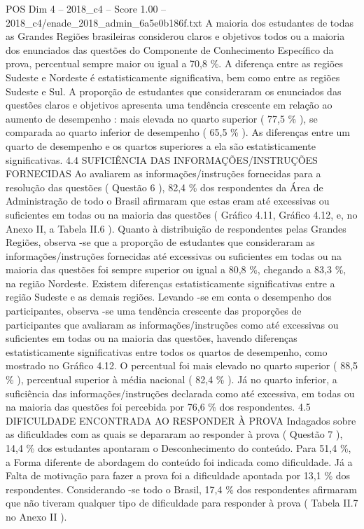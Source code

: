 \begin{textsample}{POS Dim 4 – 2018\_c4 – Score 1.00 – 2018\_c4/enade\_2018\_admin\_6a5e0b186f.txt}
A maioria dos estudantes de todas as Grandes Regiões brasileiras considerou claros e objetivos todos ou a maioria dos enunciados das questões do Componente de Conhecimento Específico da prova, percentual sempre maior ou igual a 70,8 \%.
A diferença entre as regiões Sudeste e Nordeste é estatisticamente significativa, bem como entre as regiões Sudeste e Sul.
A proporção de estudantes que consideraram os enunciados das questões claros e objetivos apresenta uma tendência crescente em relação ao aumento de desempenho : mais elevada no quarto superior ( 77,5 \% ), se comparada ao quarto inferior de desempenho ( 65,5 \% ).
As diferenças entre um quarto de desempenho e os quartos superiores a ela são estatisticamente significativas. 4.4 SUFICIÊNCIA DAS INFORMAÇÕES/INSTRUÇÕES FORNECIDAS Ao avaliarem as informações/instruções fornecidas para a resolução das questões ( Questão 6 ), 82,4 \% dos respondentes da Área de Administração de todo o Brasil afirmaram que estas eram até excessivas ou suficientes em todas ou na maioria das questões ( Gráfico 4.11, Gráfico 4.12, e, no Anexo II, a Tabela II.6 ).
Quanto à distribuição de respondentes pelas Grandes Regiões, observa -se que a proporção de estudantes que consideraram as informações/instruções fornecidas até excessivas ou suficientes em todas ou na maioria das questões foi sempre superior ou igual a 80,8 \%, chegando a 83,3 \%, na região Nordeste.
Existem diferenças estatisticamente significativas entre a região Sudeste e as demais regiões.
Levando -se em conta o desempenho dos participantes, observa -se uma tendência crescente das proporções de participantes que avaliaram as informações/instruções como até excessivas ou suficientes em todas ou na maioria das questões, havendo diferenças estatisticamente significativas entre todos os quartos de desempenho, como mostrado no Gráfico 4.12.
O percentual foi mais elevado no quarto superior ( 88,5 \% ), percentual superior à média nacional ( 82,4 \% ).
Já no quarto inferior, a suficiência das informações/instruções declarada como até excessiva, em todas ou na maioria das questões foi percebida por 76,6 \% dos respondentes. 4.5 DIFICULDADE ENCONTRADA AO RESPONDER À PROVA Indagados sobre as dificuldades com as quais se depararam ao responder à prova ( Questão 7 ), 14,4 \% dos estudantes apontaram o Desconhecimento do conteúdo.
Para 51,4 \%, a Forma diferente de abordagem do conteúdo foi indicada como dificuldade.
Já a Falta de motivação para fazer a prova foi a dificuldade apontada por 13,1 \% dos respondentes.
Considerando -se todo o Brasil, 17,4 \% dos respondentes afirmaram que não tiveram qualquer tipo de dificuldade para responder à prova ( Tabela II.7 no Anexo II ).

\end{textsample}
